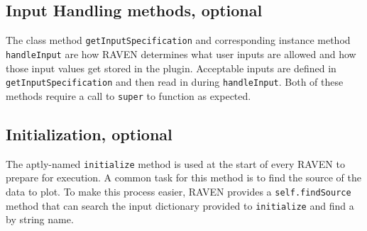 %
%
\subsection{Input Handling methods, optional}
The class method \texttt{getInputSpecification} and corresponding instance method
\texttt{handleInput} are how RAVEN determines what user inputs are allowed and how those input
values get stored in the plugin. Acceptable inputs are defined in \texttt{getInputSpecification}
and then read in during \texttt{handleInput}. Both of these methods require a call to \texttt{super}
to function as expected.

%
%
\subsection{Initialization, optional}
The aptly-named \texttt{initialize} method is used at the start of every RAVEN  to prepare
for execution. A common task for this method is to find the source of the data to plot. To make this
process easier, RAVEN provides a \texttt{self.findSource} method that can search the input dictionary
provided to \texttt{initialize} and find a  by string name.

%
%
